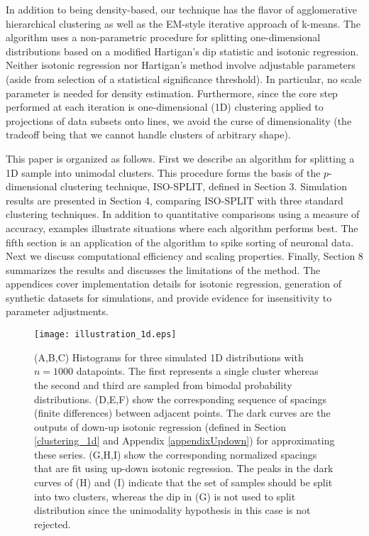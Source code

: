 \documentclass[10pt]{article}
\begin{document}
In addition to being density-based, our technique has the flavor of agglomerative hierarchical clustering as well as the EM-style iterative approach of k-means. The algorithm uses a non-parametric procedure for splitting one-dimensional distributions based on a modified Hartigan's dip statistic \citep{hartigan1985dip} and isotonic regression. Neither isotonic regression nor Hartigan's method involve adjustable parameters (aside from selection of a statistical significance threshold). In particular, no scale parameter is needed for density estimation. Furthermore, since the core step performed at each iteration is one-dimensional (1D) clustering applied to projections of data subsets onto lines, we avoid the curse of dimensionality (the tradeoff being that we cannot handle clusters of arbitrary shape).

This paper is organized as follows. First we describe an algorithm for splitting a 1D sample into unimodal clusters. This procedure forms the basis of the $p$-dimensional clustering technique, ISO-SPLIT, defined in Section 3. Simulation results are presented in Section 4, comparing ISO-SPLIT with three standard clustering techniques. In addition to quantitative comparisons using a measure of accuracy, examples illustrate situations where each algorithm performs best. The fifth section is an application of the algorithm to spike sorting of neuronal data. Next we discuss computational efficiency and scaling properties. Finally, Section 8 summarizes the results and discusses the limitations of the method. The appendices cover implementation details for isotonic regression, generation of synthetic datasets for simulations, and provide evidence for insensitivity to parameter adjustments.


\begin{figure}
\begin{center}
\texttt{[image: illustration\_1d.eps]}
\end{center}
\caption{
(A,B,C) Histograms for three simulated 1D distributions with $n=1000$ datapoints. The first represents a single cluster whereas the second and third are sampled from bimodal probability distributions. (D,E,F) show the corresponding sequence of spacings (finite differences) between adjacent points. The dark curves are the outputs of down-up isotonic regression (defined in Section \ref{clustering_1d} and Appendix \ref{appendixUpdown}) for approximating these series. (G,H,I) show the corresponding normalized spacings that are fit using up-down isotonic regression. The peaks in the dark curves of (H) and (I) indicate that the set of samples should be split into two clusters, whereas the dip in (G) is not used to split distribution since the unimodality hypothesis in this case is not rejected.
}
\label{fig:plots_1d}
\end{figure}
\end{document}
